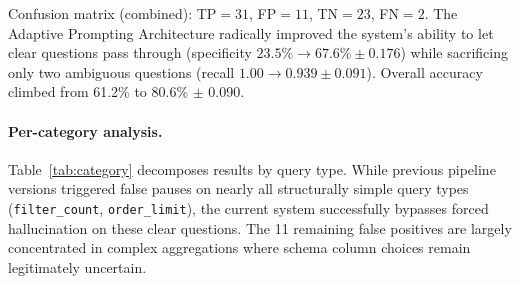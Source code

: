 \documentclass{article}
\begin{document}
Confusion matrix (combined): TP$=31$, FP$=11$, TN$=23$, FN$=2$.
The Adaptive Prompting Architecture radically improved the system's ability
to let clear questions pass through (specificity $23.5\% \to 67.6\% \pm 0.176$) while
sacrificing only two ambiguous questions (recall $1.00 \to 0.939 \pm 0.091$).
Overall accuracy climbed from 61.2\% to 80.6\% $\pm$ 0.090.

\paragraph{Per-category analysis.}
Table~\ref{tab:category} decomposes results by query type.
While previous pipeline versions triggered false pauses on nearly all
structurally simple query types (\texttt{filter\_count}, \texttt{order\_limit}),
the current system successfully bypasses forced hallucination on these clear
questions. The 11 remaining false positives are largely concentrated in complex
aggregations where schema column choices remain legitimately uncertain.
\end{document}
